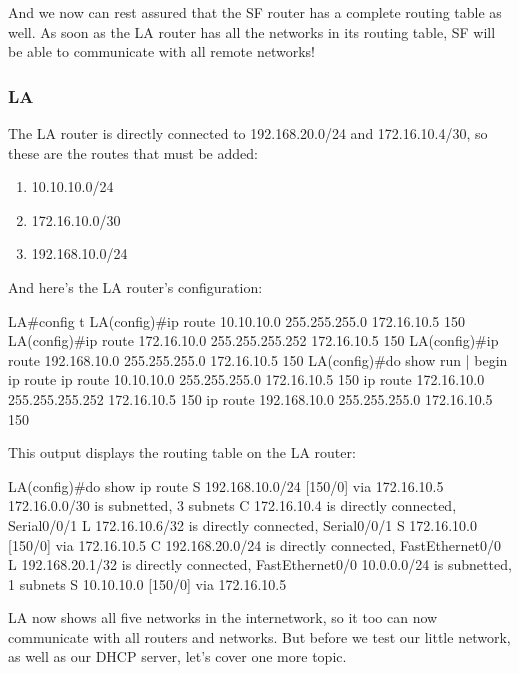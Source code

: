 And we now can rest assured that the SF router has a complete routing
table as well. As soon as the LA router has all the networks in its
routing table, SF will be able to communicate with all remote networks!

\subsubsection{LA}

The LA router is directly connected to 192.168.20.0/24 and
172.16.10.4/30, so these are the routes that must be added:

\begin{enumerate}
\item
  10.10.10.0/24
\item
  172.16.10.0/30
\item
  192.168.10.0/24
\end{enumerate}

\protect\hypertarget{c09.xhtmlux5cux23Page_387}{}{}And here's the LA
router's configuration:

\begin{cli}
LA#config t
LA(config)#ip route 10.10.10.0 255.255.255.0 172.16.10.5 150
LA(config)#ip route 172.16.10.0 255.255.255.252 172.16.10.5 150
LA(config)#ip route 192.168.10.0 255.255.255.0 172.16.10.5 150
LA(config)#do show run | begin ip route
ip route 10.10.10.0 255.255.255.0 172.16.10.5 150
ip route 172.16.10.0 255.255.255.252 172.16.10.5 150
ip route 192.168.10.0 255.255.255.0 172.16.10.5 150
\end{cli}

This output displays the routing table on the LA router:

\begin{cli}
LA(config)#do show ip route
S    192.168.10.0/24 [150/0] via 172.16.10.5
     172.16.0.0/30 is subnetted, 3 subnets
C       172.16.10.4 is directly connected, Serial0/0/1
L       172.16.10.6/32 is directly connected, Serial0/0/1
S       172.16.10.0 [150/0] via 172.16.10.5
C    192.168.20.0/24 is directly connected, FastEthernet0/0
L    192.168.20.1/32 is directly connected, FastEthernet0/0
     10.0.0.0/24 is subnetted, 1 subnets
S       10.10.10.0 [150/0] via 172.16.10.5
\end{cli}

LA now shows all five networks in the internetwork, so it too can now
communicate with all routers and networks. But before we test our little
network, as well as our DHCP server, let's cover one more topic.

